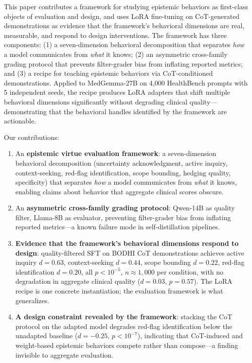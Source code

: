 \documentclass{article}
\newcommand{\bodhi}{BODHI}
\begin{document}
This paper contributes a framework for studying epistemic behaviors as first-class objects of evaluation and design, and uses LoRA fine-tuning on CoT-generated demonstrations as evidence that the framework's behavioral dimensions are real, measurable, and respond to design interventions. The framework has three components: (1) a seven-dimension behavioral decomposition that separates \emph{how} a model communicates from \emph{what} it knows; (2) an asymmetric cross-family grading protocol that prevents filter-grader bias from inflating reported metrics; and (3) a recipe for teaching epistemic behaviors via CoT-conditioned demonstrations. Applied to MedGemma-27B \citep{medgemma2025} on 4,000 HealthBench \citep{healthbench2025} prompts with 5 independent seeds, the recipe produces LoRA adapters that shift multiple behavioral dimensions significantly without degrading clinical quality---demonstrating that the behavioral handles identified by the framework are actionable.

Our contributions:
\begin{enumerate}[leftmargin=*]
    \item An \textbf{epistemic virtue evaluation framework}: a seven-dimension behavioral decomposition (uncertainty acknowledgment, active inquiry, context-seeking, red-flag identification, scope bounding, hedging quality, specificity) that separates \emph{how} a model communicates from \emph{what} it knows, enabling claims about behavior that aggregate clinical scores obscure.
    \item An \textbf{asymmetric cross-family grading protocol}: Qwen-14B as quality filter, Llama-8B as evaluator, preventing filter-grader bias from inflating reported metrics---a known failure mode in self-distillation pipelines.
    \item \textbf{Evidence that the framework's behavioral dimensions respond to design}: quality-filtered SFT on \bodhi{} CoT demonstrations achieves active inquiry $d=0.63$, context-seeking $d=0.44$, scope bounding $d=0.22$, red-flag identification $d=0.20$, all $p < 10^{-5}$, $n\approx1{,}000$ per condition, with no degradation in aggregate clinical quality ($d=0.03$, $p=0.57$). The LoRA recipe is one concrete instantiation; the evaluation framework is what generalizes.
    \item \textbf{A design constraint revealed by the framework}: stacking the CoT protocol on the adapted model degrades red-flag identification below the unadapted baseline ($d=-0.25$, $p<10^{-7}$), indicating that CoT-induced and weight-based epistemic behaviors compete rather than compose---a finding invisible to aggregate evaluation.
\end{enumerate}
\end{document}
